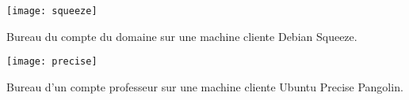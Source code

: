 \documentclass[french,a4paper,12pt]{article}
\begin{document}



\begin{center}
\end{center}

\vspace{\fill}

\begin{center}
\texttt{[image: squeeze]}%
\par
Bureau du compte  du domaine sur
une machine cliente Debian Squeeze.
\end{center}

\vspace{\fill}
\label{capture}

\begin{center}
\texttt{[image: precise]}%
\par
Bureau d'un compte professeur sur
une machine cliente Ubuntu Precise Pangolin.
\end{center}

\newpage


\vspace*{\fill}
\end{document}
